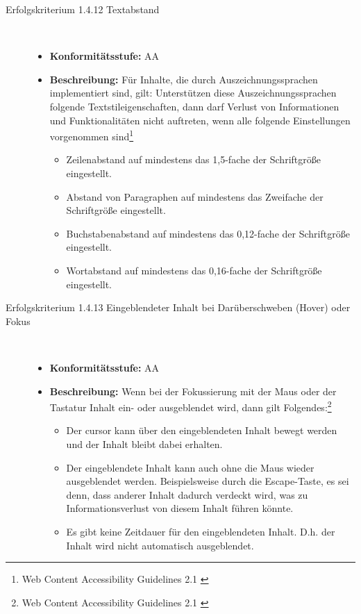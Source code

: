 \begin{description}
\begin{description}
		\item [Erfolgskriterium 1.4.12 Textabstand]\hfill \\
		\begin{itemize}
			\item \textbf{Konformitätsstufe:} AA
			\item \textbf{Beschreibung:} Für Inhalte, die durch Auszeichnungssprachen implementiert sind, gilt: Unterstützen diese Auszeichnungssprachen folgende
			 Textstileigenschaften, dann darf Verlust von Informationen und Funktionalitäten nicht auftreten, wenn alle folgende Einstellungen vorgenommen 
			sind\footnote{Web Content Accessibility Guidelines 2.1 \cite{WCAG2.1}}
			\begin{itemize}
				\item Zeilenabstand auf mindestens das 1,5-fache der Schriftgröße eingestellt.
				\item Abstand von Paragraphen auf mindestens das Zweifache der Schriftgröße eingestellt.
				\item Buchstabenabstand auf mindestens das 0,12-fache der Schriftgröße eingestellt.
				\item Wortabstand auf mindestens das 0,16-fache der Schriftgröße eingestellt.
			\end{itemize}
		\end{itemize}
		
		\item [Erfolgskriterium 1.4.13 Eingeblendeter Inhalt bei Darüberschweben (Hover) oder Fokus]\hfill \\
		\begin{itemize}
			\item \textbf{Konformitätsstufe:} AA
			\item \textbf{Beschreibung:} Wenn bei der Fokussierung mit der Maus oder der Tastatur Inhalt ein- oder ausgeblendet wird, dann gilt 
			Folgendes:\footnote{Web Content Accessibility Guidelines 2.1 \cite{WCAG2.1}}
			\begin{itemize}
				\item Der cursor kann über den eingeblendeten Inhalt bewegt werden und der Inhalt bleibt dabei erhalten.
				\item Der eingeblendete Inhalt kann auch ohne die Maus wieder ausgeblendet werden. Beispielsweise durch die Escape-Taste, es sei denn, dass anderer Inhalt dadurch 
				verdeckt wird, was zu Informationsverlust von diesem Inhalt führen könnte.
				\item Es gibt keine Zeitdauer für den eingeblendeten Inhalt. D.h. der Inhalt wird nicht automatisch ausgeblendet.
			\end{itemize}
		\end{itemize}
	\end{description}


\end{description}
